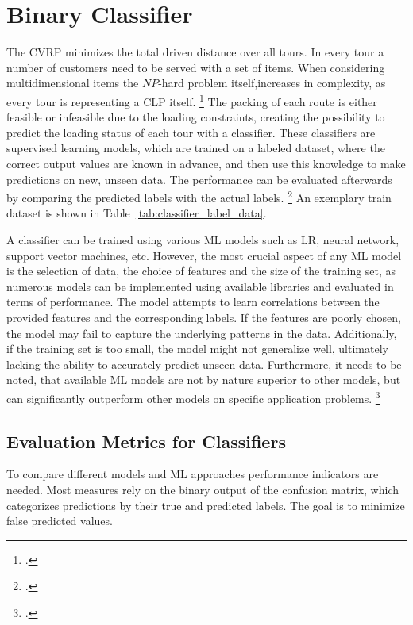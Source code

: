 \chapter{Binary Classifier}
\label{chap:classifier}

The \gls{CVRP} minimizes the total driven distance over all tours. In every tour
a number of customers need to be served with a set of items. When considering multidimensional items
the $NP$-hard problem itself,increases in complexity, as every tour is representing a \gls{CLP} itself. \footcite[cf.][p. 1f]{tamke_branch-and-cut_2024}
The packing of each route is either feasible or infeasible due to the loading constraints,
creating the possibility to predict the loading status of each tour with a classifier.
These classifiers are supervised learning models, which are trained on a labeled dataset,
where the correct output values are known in advance, and then use this knowledge to
make predictions on new, unseen data. The performance can be evaluated afterwards by comparing
the predicted labels with the actual labels. \footcite[cf.][]{kotsiantis_supervised_2007}
An exemplary train dataset is shown in Table~\ref{tab:classifier_label_data}.



A classifier can be trained using various \gls{ML} models such as \gls{LR},
neural network, support vector machines, etc. However, the most crucial aspect of any
\gls{ML} model is the selection of data, the choice of features and the size of the training set,
as numerous models can be implemented using available libraries and evaluated in terms of performance.
The model attempts to learn correlations between the provided features
and the corresponding labels. If the features are poorly chosen, the model may fail
to capture the underlying patterns in the data. Additionally, if the training set
is too small, the model might not generalize well, ultimately lacking the ability
to accurately predict unseen data. Furthermore, it needs to be noted, that available
\gls{ML} models are not by nature superior to other models, but can significantly outperform
other models on specific application problems. \footcite[cf.][pp. 250, 264]{kotsiantis_supervised_2007}


\section{Evaluation Metrics for Classifiers}
\label{sec:classifier_objectives}
To compare different models and \gls{ML} approaches performance indicators are needed. Most measures rely
on the binary output of the confusion matrix, which categorizes predictions by their true and predicted labels.
The goal is to minimize false predicted values.

